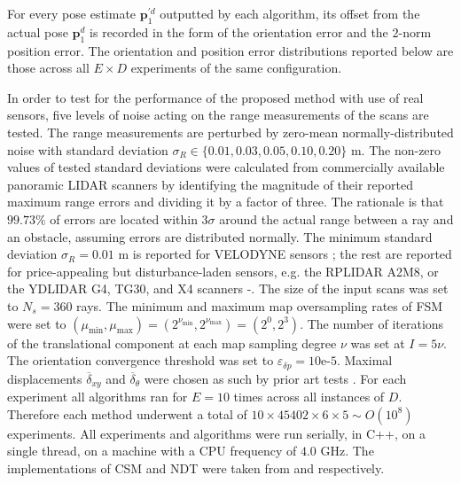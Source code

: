 For every pose estimate $\bm{p}_1^{\prime d}$ outputted by each algorithm, its
offset from the actual pose $\bm{p}_1^d$ is recorded in the form of the
orientation error and the $2$-norm position error. The orientation and position
error distributions reported below are those across all $E \times D$
experiments of the same configuration.

In order to test for the performance of the proposed method with use of real
sensors, five levels of noise acting on the range measurements of the scans are
tested. The range measurements are perturbed by zero-mean normally-distributed
noise with standard deviation $\sigma_R \in \{0.01, 0.03, 0.05, 0.10, 0.20\}$ m.
The non-zero values of tested standard deviations were calculated from
commercially available panoramic LIDAR scanners by identifying the magnitude of
their reported maximum range errors and dividing it by a factor of three. The
rationale is that $99.73\%$ of errors are located within $3\sigma$ around the
actual range between a ray and an obstacle, assuming errors are distributed
normally. The minimum standard deviation $\sigma_R = 0.01$ m is reported for
VELODYNE sensors \cite{velodyne_datasheet}; the rest are reported for
price-appealing but disturbance-laden sensors, e.g. the RPLIDAR A2M8, or the
YDLIDAR G4, TG30, and X4 scanners \cite{a2m8_datasheet}-\cite{x4_datasheet}. The
size of the input scans was set to $N_s=360$ rays. The minimum and maximum map
oversampling rates of FSM were set to $(\mu_{\min},\mu_{\max}) =
(2^{\nu_{\min}},2^{\nu_{\max}}) = (2^0,2^3)$. The number of iterations of the
translational component at each map sampling degree $\nu$ was set at $I =
5\nu$. The orientation convergence threshold was set to $\varepsilon_{\delta p}
= 10$e-$5$. Maximal displacements $\overline{\delta}_{xy}$ and
$\overline{\delta}_\theta$ were chosen as such by prior art tests \cite{plicp}.
For each experiment all algorithms ran for $E = 10$ times across all
instances of $D$. Therefore each method underwent a total of
$10 \times 45402 \times 6 \times 5 \sim O(10^8)$ experiments.
All experiments and algorithms were run serially, in C++, on
a single thread, on a machine with a CPU frequency of $4.0$ GHz. The
implementations of CSM and NDT were taken from \cite{csm_implementation} and
\cite{ndt_implementation} respectively.
